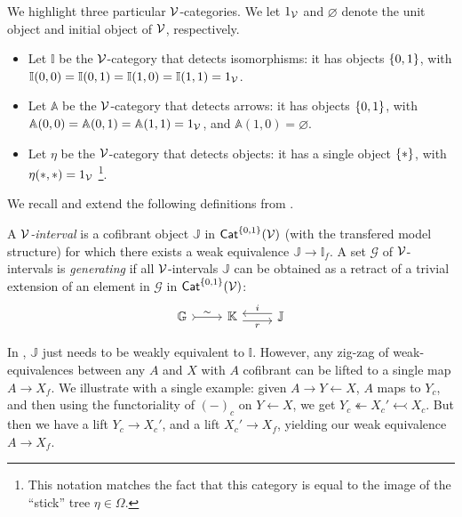 \documentclass[a4paper,10pt
,draft
]{article}%
\newcommand{\I}{\mathbb I}
\newcommand{\J}{\mathbb J}
\renewcommand{\1}{\eta}%
\begin{document}
\begin{definition}
      We highlight three particular $\mathcal V$-categories.
      We let $1_{\mathcal V}$ and $\varnothing$ denote the unit object and initial object of $\mathcal V$, respectively.
      \begin{itemize} %
      \item Let $\I$ be the $\mathcal V$-category that detects isomorphisms: it has objects $\left\{0,1\right\}$,
            with $\I(0,0) = \I(0,1) = \I(1,0) = \I(1,1) = 1_\V$.
      \item Let $\mathbb A$ be the $\mathcal V$-category that detects arrows: it has objects $\left\{0,1\right\}$,
            with $\mathbb A(0,0) = \mathbb A(0,1) = \mathbb A(1,1) = 1_{\mathcal V}$, and $\mathbb A(1,0) = \varnothing$.
      \item Let $\1$ be the $\mathcal V$-category that detects objects: it has a single object $\set{\**}$, with $\1(\**, \**) = 1_\V$
            \footnote{
              This notation matches the fact that this category is equal to the image of the ``stick'' tree $\eta \in \Omega$.}.
      \end{itemize}
\end{definition}

We recall and extend the following definitions from \cite{BM13}. 

\begin{definition}
      A {\em $\mathcal V$-interval} is a cofibrant object $\J$ in $\mathsf{Cat}^{\left\{0,1\right\}}(\mathcal V)$ (with the transfered model structure)
      for which there exists a weak equivalence $\J \to \I_f$.
      A set $\mathcal{G}$ of $\mathcal V$-intervals is {\em generating} if all $\mathcal V$-intervals $\J$ can be obtained
      as a retract of a trivial extension of an element in $\mathcal{G}$ in $\mathsf{Cat}^{\left\{0,1\right\}}(\mathcal V)$:
      \begin{equation}
            \begin{tikzcd}
                  \mathbb{G} \arrow[r,rightarrowtail, "\sim"]
                  &
                  \mathbb{K} \arrow[r,yshift=-.3em, "r"']
                  &
                  \mathbb{J} \arrow[l,yshift=.3em, "i"']
            \end{tikzcd}
      \end{equation}
\end{definition}

\begin{remark}
      In \cite{BM13}, $\J$ just needs to be weakly equivalent to $\I$.
      However, any zig-zag of weak-equivalences between any $A$ and $X$ with $A$ cofibrant
      can be lifted to a single map $A \to X_f$.
      We illustrate with a single example:
      given $A \to Y \leftarrow X$, $A$ maps to $Y_c$, and then using the functoriality of $(-)_c$ on $Y \leftarrow X$, we get
      $Y_c \twoheadleftarrow X_c' \leftarrowtail X_c$.
      But then we have a lift $Y_c \to X_c'$, and a lift $X_c' \to X_f$, yielding our weak equivalence $A \to X_f$.      
\end{remark}
\end{document}
